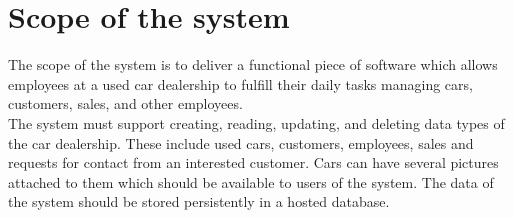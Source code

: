 \section{Scope of the system}
The scope of the system is to deliver a functional piece of software which allows employees at a used car dealership to fulfill their daily tasks managing cars, customers, sales, and other employees.\\

The system must support creating, reading, updating, and deleting data types of the car dealership. 
These include used cars, customers, employees, sales and requests for contact from an interested customer. 
Cars can have several pictures attached to them which should be available to users of the system. 
The data of the system should be stored persistently in a hosted database. 
